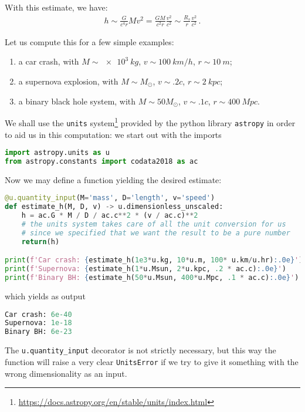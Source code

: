 \documentclass[main.tex]{subfiles}
\begin{document}
With this estimate, we have: 
%
\begin{align}
h \sim \frac{G}{c^{4}r} M v^2 = \frac{GM}{c^2 r} \frac{v^2}{c^2} \sim \frac{R_s}{r} \frac{v^2}{c^2}
\,.
\end{align}

Let us compute this for a few simple examples: 
\begin{enumerate}
    \item a car crash, with \(M \sim \SI{e3}{kg}\), \(v \sim \SI{100}{km/h}\), \(r \sim \SI{10}{m}\);
    \item a supernova explosion, with \(M \sim M_{\odot}\), \(v \sim \num{.2}c\), \(r \sim \SI{2}{kpc}\);
    \item a binary black hole system, with \(M \sim 50M_{\odot}\), \(v \sim \num{.1}c\), \(r \sim \SI{400}{Mpc}\).
\end{enumerate}

We shall use the \texttt{units} system\footnote{\url{https://docs.astropy.org/en/stable/units/index.html}} provided by the python library \texttt{astropy} in order to aid us in this computation: 
we start out with the imports 
\begin{lstlisting}[language=Python]
import astropy.units as u
from astropy.constants import codata2018 as ac
\end{lstlisting}

Now we may define a function yielding the desired estimate: 
\begin{lstlisting}[language=Python]
@u.quantity_input(M='mass', D='length', v='speed')
def estimate_h(M, D, v) -> u.dimensionless_unscaled:
    h = ac.G * M / D / ac.c**2 * (v / ac.c)**2
    # the units system takes care of all the unit conversion for us
    # since we specified that we want the result to be a pure number
    return(h)

print(f'Car crash: {estimate_h(1e3*u.kg, 10*u.m, 100* u.km/u.hr):.0e}')
print(f'Supernova: {estimate_h(1*u.Msun, 2*u.kpc, .2 * ac.c):.0e}')
print(f'Binary BH: {estimate_h(50*u.Msun, 400*u.Mpc, .1 * ac.c):.0e}')
\end{lstlisting}
%
which yields as output
\begin{lstlisting}[language=Python]
Car crash: 6e-40
Supernova: 1e-18
Binary BH: 6e-23
\end{lstlisting}

The \texttt{u.quantity\_input} decorator is not strictly necessary, but this way the function will raise a very clear \texttt{UnitsError} if we try to give it something with the wrong dimensionality as an input.

\end{document}
